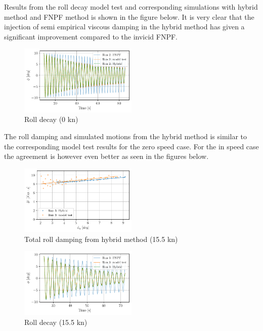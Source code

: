     Results from the roll decay model test and corresponding simulations
with hybrid method and FNPF method is shown in the figure below. It is
very clear that the injection of semi empirical viscous damping in the
hybrid method has given a significant improvement compared to the
invicid FNPF.

    \begin{figure}[H]
        \begin{center}\includegraphics[width = 0.5\textwidth]{figures/hybrid_0_time.pdf}\end{center}
        \vspace{-1cm}
        \caption{Roll decay (0 kn)}
        \label{fig:hybrid_0_time}
    \end{figure}
    
    The roll damping and simulated motions from the hybrid method is similar
to the corresponding model test results for the zero speed case. For the
in speed case the agreement is however even better as seen in the
figures below.

    \begin{figure}[H]
        \begin{center}\includegraphics[width = 0.5\textwidth]{figures/hybrid_speed_amplitudes.pdf}\end{center}
        \vspace{-1cm}
        \caption{Total roll damping from hybrid method (15.5 kn)}
        \label{fig:hybrid_speed_amplitudes}
    \end{figure}
    
    \begin{figure}[H]
        \begin{center}\includegraphics[width = 0.5\textwidth]{figures/hybrid_speed_time.pdf}\end{center}
        \vspace{-1cm}
        \caption{Roll decay (15.5 kn)}
        \label{fig:hybrid_speed_time}
    \end{figure}
    
